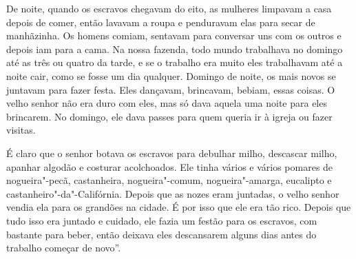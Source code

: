 De noite, quando os escravos chegavam do eito, as mulheres
limpavam a casa depois de comer, então lavavam a roupa e penduravam elas
para secar de manhãzinha. Os homens comiam, sentavam para conversar uns
com os outros e depois iam para a cama. Na nossa fazenda, todo mundo
trabalhava no domingo até as três ou quatro da tarde, e se o trabalho
era muito eles trabalhavam até a noite cair, como se fosse um dia
qualquer. Domingo de noite, os mais novos se juntavam para fazer festa.
Eles dançavam, brincavam, bebiam, essas coisas. O velho senhor não era
duro com eles, mas só dava aquela uma noite para eles brincarem. No
domingo, ele dava passes para quem queria ir à igreja ou fazer
visitas.

É claro que o senhor botava os escravos para debulhar milho,
descascar milho, apanhar algodão e costurar acolchoados. Ele tinha
vários e vários pomares de nogueira"-pecã, castanheira, nogueira"-comum,
nogueira"-amarga, eucalipto e castanheiro"-da"-Califórnia. Depois que as
nozes eram juntadas, o velho senhor vendia ela para os grandões na
cidade. É por isso que ele era tão rico. Depois que tudo isso era
juntado e cuidado, ele fazia um festão para os escravos, com bastante
para beber, então deixava eles descansarem alguns dias antes do trabalho
começar de novo''.

